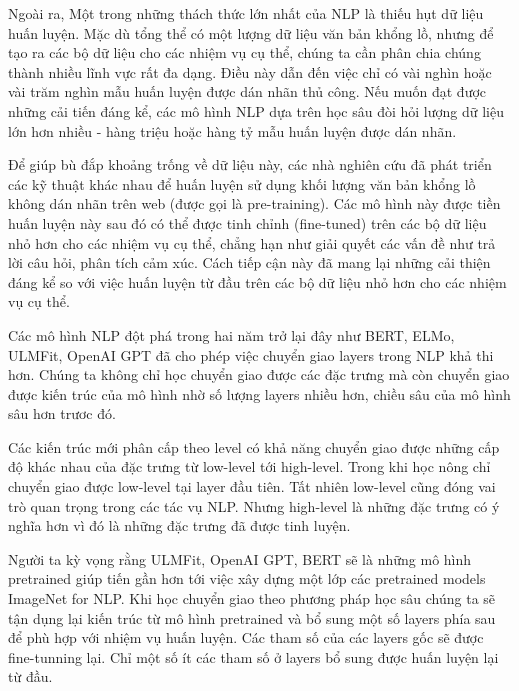Ngoài ra, Một trong những thách thức lớn nhất của NLP là thiếu hụt dữ liệu huấn luyện. Mặc dù tổng thể có một lượng dữ liệu văn bản khổng lồ, nhưng để tạo ra các bộ dữ liệu cho các nhiệm vụ cụ thể, chúng ta cần phân chia chúng thành nhiều lĩnh vực rất đa dạng. Điều này dẫn đến việc chỉ có vài nghìn hoặc vài trăm nghìn mẫu huấn luyện được dán nhãn thủ công. Nếu muốn đạt được những cải tiến đáng kể, các mô hình NLP dựa trên học sâu đòi hỏi lượng dữ liệu lớn hơn nhiều - hàng triệu hoặc hàng tỷ mẫu huấn luyện được dán nhãn.

Để giúp bù đắp khoảng trống về dữ liệu này, các nhà nghiên cứu đã phát triển các kỹ thuật khác nhau để huấn luyện sử dụng khối lượng văn bản khổng lồ không dán nhãn trên web (được gọi là pre-training). Các mô hình này được tiền huấn luyện này sau đó có thể được tinh chỉnh (fine-tuned) trên các bộ dữ liệu nhỏ hơn cho các nhiệm vụ cụ thể, chẳng hạn như giải quyết các vấn đề như trả lời câu hỏi, phân tích cảm xúc. Cách tiếp cận này đã mang lại những cải thiện đáng kể so với việc huấn luyện từ đầu trên các bộ dữ liệu nhỏ hơn cho các nhiệm vụ cụ thể. 

Các mô hình NLP đột phá trong hai năm trở lại đây như BERT, ELMo, ULMFit, OpenAI GPT đã cho phép việc chuyển giao layers trong NLP khả thi hơn. Chúng ta không chỉ học chuyển giao được các đặc trưng mà còn chuyển giao được kiến trúc của mô hình nhờ số lượng layers nhiều hơn, chiều sâu của mô hình sâu hơn trươc đó.

Các kiến trúc mới phân cấp theo level có khả năng chuyển giao được những cấp độ khác nhau của đặc trưng từ low-level tới high-level. Trong khi học nông chỉ chuyển giao được low-level tại layer đầu tiên. Tất nhiên low-level cũng đóng vai trò quan trọng trong các tác vụ NLP. Nhưng high-level là những đặc trưng có ý nghĩa hơn vì đó là những đặc trưng đã được tinh luyện.

Người ta kỳ vọng rằng ULMFit, OpenAI GPT, BERT sẽ là những mô hình pretrained giúp tiến gần hơn tới việc xây dựng một lớp các pretrained models ImageNet for NLP. Khi học chuyển giao theo phương pháp học sâu chúng ta sẽ tận dụng lại kiến trúc từ mô hình pretrained và bổ sung một số layers phía sau để phù hợp với nhiệm vụ huấn luyện. Các tham số của các layers gốc sẽ được fine-tunning lại. Chỉ một số ít các tham số ở layers bổ sung được huấn luyện lại từ đầu\cite{webpage20}.
